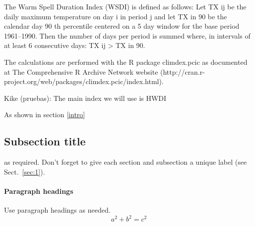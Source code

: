 The Warm Spell Duration Index (WSDI) is defined as follows: Let TX ij be the daily maximum temperature on day i in period j and let TX in 90 be the calendar day 90 th percentile centered on a 5 day window for the base period 1961–1990. Then the number of days per period is summed where, in intervals of at least 6 consecutive days: TX ij > TX in 90.

The calculations are performed with the R package climdex.pcic as documented at The Comprehensive R Archive Network website (http://cran.r-project.org/web/packages/climdex.pcic/index.html).  

Kike (pruebas): The main index we will use is HWDI \citep{rus_al2014}


As shown in section \ref{intro}
\label{sec:1}
\subsection{Subsection title}
\label{sec:2}
as required. Don't forget to give each section
and subsection a unique label (see Sect.~\ref{sec:1}).
\paragraph{Paragraph headings} Use paragraph headings as needed.
\begin{equation}
a^2+b^2=c^2
\end{equation}

